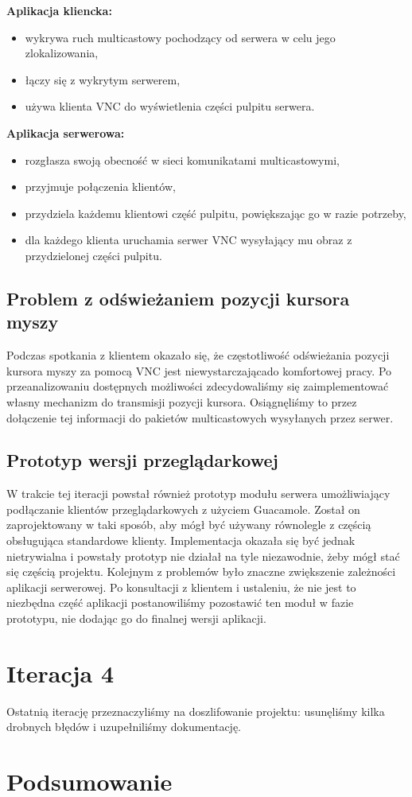     \textbf{Aplikacja kliencka:}
    \begin{itemize}[noitemsep,nolistsep]
      \item wykrywa ruch multicastowy pochodzący od serwera w celu jego zlokalizowania,
      \item łączy się z wykrytym serwerem,
      \item używa klienta VNC do wyświetlenia części pulpitu serwera.
    \end{itemize}

    \textbf{Aplikacja serwerowa:}
    \begin{itemize}[noitemsep,nolistsep]
      \item rozgłasza swoją obecność w sieci komunikatami multicastowymi,
      \item przyjmuje połączenia klientów,
      \item przydziela każdemu klientowi część pulpitu, powiększając go w razie potrzeby,
      \item dla każdego klienta uruchamia serwer VNC wysyłający mu obraz z przydzielonej części pulpitu.
    \end{itemize}

  \subsection{Problem z odświeżaniem pozycji kursora myszy}

    Podczas spotkania z klientem okazało się, że częstotliwość odświeżania pozycji kursora myszy za pomocą VNC jest niewystarczającado komfortowej pracy. Po przeanalizowaniu dostępnych możliwości zdecydowaliśmy się zaimplementować własny mechanizm do transmisji pozycji kursora. Osiągnęliśmy to przez dołączenie tej informacji do pakietów multicastowych wysyłanych przez serwer.

  \subsection{Prototyp wersji przeglądarkowej}

    W trakcie tej iteracji powstał również prototyp modułu serwera umożliwiający podłączanie klientów przeglądarkowych z użyciem Guacamole. Został on zaprojektowany w taki sposób, aby mógł być używany równolegle z częścią obsługująca standardowe  klienty. Implementacja okazała się być jednak nietrywialna i powstały prototyp nie działał na tyle niezawodnie, żeby mógł stać się częścią projektu. Kolejnym z problemów było znaczne zwiększenie zależności aplikacji serwerowej. Po konsultacji z klientem i ustaleniu, że nie jest to niezbędna część aplikacji postanowiliśmy pozostawić ten moduł w fazie prototypu, nie dodając go do finalnej wersji aplikacji.

\section{Iteracja 4}

  Ostatnią iterację przeznaczyliśmy na doszlifowanie projektu: usunęliśmy kilka drobnych błędów i uzupełniliśmy dokumentację.

\section{Podsumowanie}


